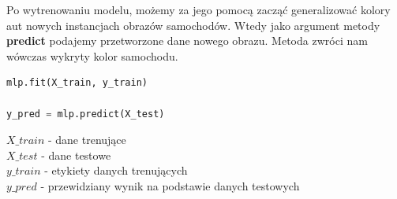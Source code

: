 Po wytrenowaniu modelu, możemy za jego pomocą zacząć generalizować kolory aut nowych instancjach obrazów samochodów. Wtedy jako argument metody \textbf{predict} podajemy przetworzone dane nowego obrazu. Metoda zwróci nam wówczas wykryty kolor samochodu.

\begin{lstlisting}[language=Python, caption=Trenowanie modelu i przewidywanie]
mlp.fit(X_train, y_train)

y_pred = mlp.predict(X_test)
\end{lstlisting}
\begin{math}
X\_train
\end{math}
- dane trenujące\\
\begin{math}
X\_test
\end{math}
- dane testowe\\
\begin{math}
y\_train
\end{math}
- etykiety danych trenujących\\
\begin{math}
y\_pred
\end{math}
- przewidziany wynik na podstawie danych testowych\\


